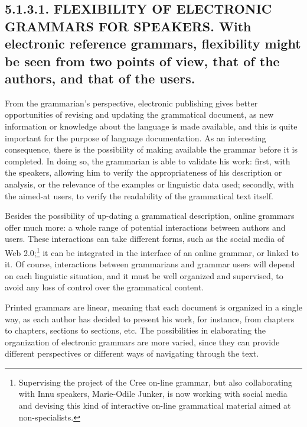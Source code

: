 \documentclass[letterpaper]{article}
\begin{document}
\subsection[5.1.3.1. FLEXIBILITY OF ELECTRONIC GRAMMARS FOR SPEAKERS. With electronic reference grammars, flexibility might be seen from two points of view, that of the authors, and that of the users.]{5.1.3.1. FLEXIBILITY OF ELECTRONIC GRAMMARS FOR SPEAKERS. \textmd{With electronic reference grammar}\textmd{s}\textmd{, flexibility might be seen from }\textmd{two }\textmd{points of view, that of the authors, and that of the users.}}
From the grammarian{\textquoteright}s perspective, electronic publishing gives better opportunities of revising and updating the grammatical document, as new information or knowledge about the language is made available, and this is quite important for the purpose of language documentation. As an interesting conse\-quence, there is the possibility of making available the grammar before it is completed. In doing so, the grammarian is able to validate his work: first, with the speakers, allowing him to verify the appropriateness of his description or analysis, or the relevance of the examples or linguistic data used; secondly, with the aimed{}-at users, to verify the readability of the grammatical text itself. 

Besides the possibility of up-dating a grammatical description, online grammars offer much more: a whole range of potential interactions between authors and users. These interactions can take different forms, such as the social media of Web 2.0;\footnote{ Supervising the project of the Cree on-line grammar, but also collaborating with Innu speakers, Marie-Odile Junker, is now working with social media and devising this kind of interactive on-line grammatical material aimed at non-specialists. } it can be integrated in the interface of an online grammar, or linked to it. Of course, interactions between grammarians and grammar users will depend on each linguis\-tic situation, and it must be well organized and supervised, to avoid any loss of control over the grammatical content.

Printed grammars are linear, meaning that each document is organized in  a single way, as each author has decided to present his work, for instance, from chapters to chapters, sections to sections, etc. The possibilities in elaborating the organization of electronic grammars are more varied, since they can provide different perspectives or different ways of navigating through the text.
\end{document}
